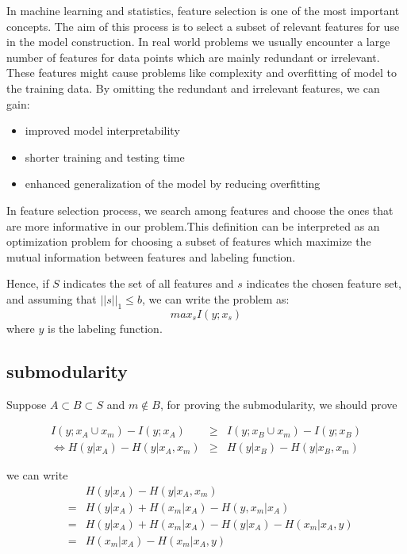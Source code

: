 In machine learning and statistics, feature selection is one of the most important concepts. The aim of this process is to select a subset of relevant features for use in the model construction.  In real world problems we usually encounter a large number of features for data points which are mainly redundant or irrelevant. These features might cause problems like complexity  and overfitting of model to the training data. By omitting the redundant and irrelevant features, we can gain:
\begin{itemize}
\item improved model interpretability
\item shorter training and testing time
\item enhanced generalization of the model by reducing overfitting
\end{itemize} 

In feature selection process, we  search among features and choose the ones that are more informative in our problem.This definition  can be interpreted as an optimization problem for choosing a subset of features which maximize the mutual information between features and labeling function.

Hence, if $S$ indicates the set of all features and $s$ indicates the chosen feature set, and assuming that $||s||_1\leq b$, we can write the problem as:
\begin{equation*}
max_s I(y;x_s)
\end{equation*} 
where $y$ is the labeling function.

\subsection{submodularity}

Suppose $A \subset B \subset S$ and $m \not \in B$, for proving the submodularity, we should prove

\begin{eqnarray}
I(y;x_A \cup x_m) - I(y;x_A) &\geq & I(y;x_B \cup x_m) - I(y;x_B) \nonumber \\
\Leftrightarrow H(y|x_A)-H(y|x_A,x_m) &\geq & H(y|x_B)-H(y|x_B,x_m) \label{f1}
\end{eqnarray}
  
 we can write
\begin{eqnarray} 
	&&H(y|x_A)-H(y|x_A,x_m) \nonumber \\
	&=&H(y|x_A)+ H(x_m|x_A)-H(y,x_m|x_A)\nonumber \\
	&=&H(y|x_A)+ H(x_m|x_A) -H(y|x_A) - H(x_m|x_A,y)\nonumber \\
	&=& H(x_m|x_A)- H(x_m|x_A,y) \label{f2}
\end{eqnarray} 

